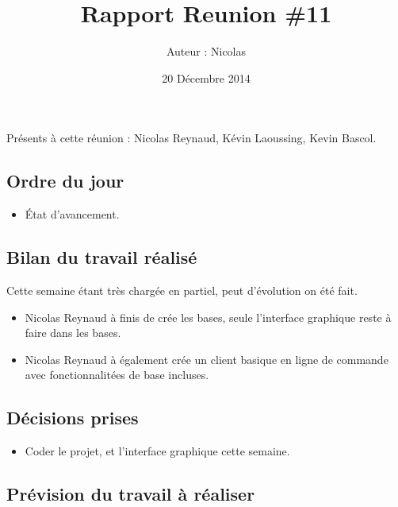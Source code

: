 \documentclass[12pt,a4paper]{article}
\title{Rapport Reunion \#11}
\author{Auteur : Nicolas \bsc{REYNAUD}}
\date{20 Décembre 2014}
\begin{document}
\maketitle

\newpage

Présents à cette réunion : Nicolas Reynaud, Kévin Laoussing, Kevin Bascol.

\subsection*{Ordre du jour}
\begin{itemize}[label = $\circledcirc$]
	\item État d'avancement.
\end{itemize}

\subsection*{Bilan du travail réalisé}
Cette semaine étant très chargée en partiel, peut d'évolution on été fait.

\begin{itemize}[label = $\circledcirc$]
	\item Nicolas Reynaud à finis de crée les bases, seule l'interface graphique reste à faire dans les bases.
	\item Nicolas Reynaud à également crée un client basique en ligne de commande avec fonctionnalitées de base incluses.
\end{itemize}


\subsection*{Décisions prises}

\begin{itemize}[label = $\circledcirc$]
	\item Coder le projet, et l'interface graphique cette semaine.
\end{itemize}

\subsection*{Prévision du travail à réaliser}
\end{document}
